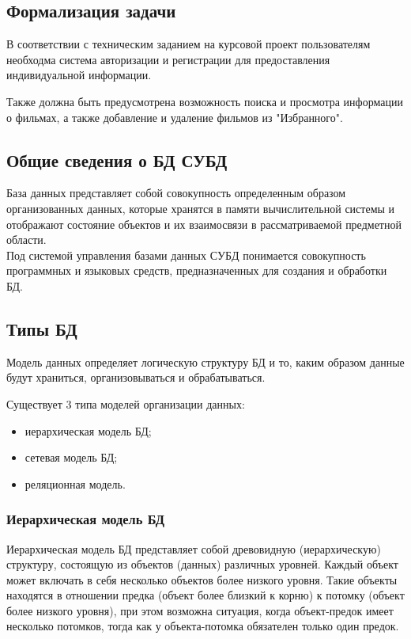 \documentclass[12pt]{article}
\begin{document}
\subsection{Формализация задачи}%
\setcounter{subsection}{1}

В соответствии с техническим заданием на курсовой проект пользователям необходма система авторизации и регистрации для предоставления индивидуальной информации.

Также должна быть предусмотрена возможность поиска и просмотра информации о фильмах, а также добавление и удаление фильмов из "Избранного".


\subsection{Общие сведения о БД  СУБД}%
\setcounter{subsection}{2}
База данных представляет собой совокупность определенным образом организованных данных, которые хранятся в памяти вычислительной системы и отображают состояние объектов и их взаимосвязи в рассматриваемой предметной области.\\
Под системой управления базами данных \(СУБД\) понимается совокупность программных и языковых средств, предназначенных для создания и обработки БД. 

\subsection{Типы БД}
\setcounter{subsection}{3}

Модель данных определяет логическую структуру БД и то, каким образом данные будут храниться, организовываться и обрабатываться. 

Существует 3 типа моделей организации данных:
\begin{itemize}
	\item иерархическая модель БД;
	\item сетевая модель БД;
	\item реляционная модель.
\end{itemize}

\subsubsection{Иерархическая модель БД}
\setcounter{subsubsection}{1}

Иерархическая модель БД представляет собой древовидную (иерархическую) структуру, состоящую из объектов (данных) различных уровней. Каждый объект может включать в себя несколько объектов более низкого уровня. Такие объекты находятся в отношении предка (объект более близкий к корню) к потомку (объект более низкого уровня), при этом возможна ситуация, когда объект-предок имеет несколько потомков, тогда как у объекта-потомка обязателен только один предок.
\end{document}
